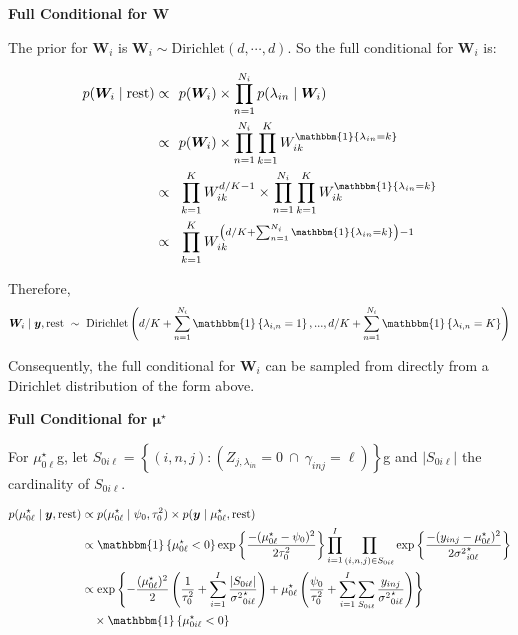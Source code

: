 \documentclass[12pt,]{article}
\newcommand{\p}[1]{\left(#1\right)}
\newcommand{\bc}[1]{ \left\{#1\right\} }
\def\Dir{\text{Dirichlet}}
\def\lin{\lambda_{in}}
\def\y{\bm{y}}
\def\mus{\mu^\star}
\newcommand{\Ind}[1]{\mathbbm{1}\bc{#1}}
\def\rest{\text{rest}}
\begin{document}
\textbf{Full Conditional for $\bm W$}

The prior for \(\bm{W}_i\) is \(\bm W_i \sim \Dir(d, \cdots, d)\). So
the full conditional for \(\bm{W}_i\) is:

\begin{align*}
p(\bm W_i \mid \rest) \propto&~~ p(\bm{W}_i) \times \prod_{n=1}^{N_i} p(\lin \mid \bm{W}_i)\\
\propto&~~ p(\bm{W}_i) \times \prod_{n=1}^{N_i}\prod_{k=1}^K W_{ik}^{\Ind{\lin=k}}\\
\propto&~~ \prod_{k=1}^K W_{ik}^{d/K-1} \times \prod_{n=1}^{N_i}\prod_{k=1}^K W_{ik}^{\Ind{\lin=k}}\\
\propto&~~ \prod_{k=1}^K W_{ik}^{\p{d/K + \sum_{n=1}^{N_i}\Ind{\lin=k}}-1}\\
%
\end{align*}

Therefore, \[
\bm{W}_i \mid \y,\rest ~\sim~ \Dir\p{d/K+\sum_{n=1}^{N_i}\Ind{\lambda_{i,n}=1},...,d/K+\sum_{n=1}^{N_i}\Ind{\lambda_{i,n}=K}} 
\]

Consequently, the full conditional for \(\bm{W}_i\) can be sampled from
directly from a Dirichlet distribution of the form above.
\vspace{2em}


\textbf{Full Conditional for $\bm\mu^\star$}

For \(\mus_{0\ell}\)g, let
\(S_{0i\ell} = \bc{(i,n,j) : \p{Z_{j,\lin} = 0 ~\cap~ \gamma_{inj} = \ell}}\)g
and \(|S_{0i\ell}|\) the cardinality of \(S_{0i\ell}\).

\newcommand\musZeroPostvarDenom{
  \frac{1}{\tau^2_0} + \sum_{i=1}^I\frac{|S_{0i\ell}|}{{\sigma^2}^\star_{0i\ell}}
}
\newcommand\musZeroPostMeanNum{
  \frac{\psi_0}{\tau^2_0} + 
  \sum_{i=1}^I \sum_{S_{0i\ell}}  
  \frac{y_{inj}}{{\sigma^2}^\star_{0i\ell}}
}

\begin{align*}
p(\mus_{0\ell} \mid \y, \rest) &\propto 
p(\mus_{0\ell} \mid \psi_0, \tau^2_0) \times p(\y \mid \mus_{0\ell},\rest) \\
%
&\propto
\Ind{\mus_{0\ell}<0} \exp\bc{\frac{-(\mus_{0\ell} - \psi_0)^2}{2\tau^2_{0}}}
\prod_{i=1}^I\prod_{(i,n,j)\in S_{0i\ell}} \exp\bc{\frac{-(y_{inj} - \mus_{0\ell})^2}{2{\sigma^2}^\star_{i0\ell}}} \\
%
&\propto
\exp\bc{
  -\frac{(\mus_{0\ell})^2}{2}\p{\musZeroPostvarDenom} + 
  \mus_{0\ell}\p{\musZeroPostMeanNum}
} \\ 
& ~~~ \times \Ind{\mus_{0i\ell}<0} \\
\end{align*}
\end{document}
